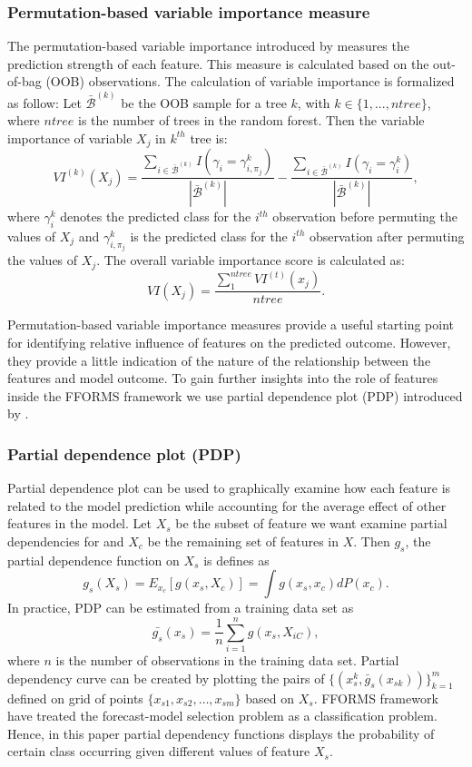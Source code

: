 \documentclass[11pt,a4paper,]{article}
\begin{document}
\subsubsection{Permutation-based variable importance
measure}\label{permutation-based-variable-importance-measure}

The permutation-based variable importance introduced by
\textcite{breiman2001random} measures the prediction strength of each
feature. This measure is calculated based on the out-of-bag (OOB)
observations. The calculation of variable importance is formalized as
follow: Let \(\bar{\mathcal{B}}^{(k)}\) be the OOB sample for a tree
\(k\), with \(k\in \{1,...,ntree\}\), where \(ntree\) is the number of
trees in the random forest. Then the variable importance of variable
\(X_{j}\) in \(k^{th}\) tree is:
\[VI^{(k)}(X_{j})=\frac{\sum_{i\in \bar{\mathcal{B}}^{(k)}}I(\gamma_{i}=\gamma_{i,\pi_{j}}^{k})}{|\bar{\mathcal{B}}^{(k)}|}-\frac{\sum_{i\in \bar{\mathcal{B}}^{(k)}}I(\gamma_{i}=\gamma_{i}^{k})}{|\bar{\mathcal{B}}^{(k)}|},\]
where \(\gamma_{i}^{k}\) denotes the predicted class for the \(i^{th}\)
observation before permuting the values of \(X_{j}\) and
\(\gamma_{i, \pi_{j}}^{k}\) is the predicted class for the \(i^{th}\)
observation after permuting the values of \(X_{j}\). The overall
variable importance score is calculated as:
\[VI(X_{j})=\frac{\sum_{1}^{ntree}VI^{(t)}(x_{j})}{ntree}.\]

Permutation-based variable importance measures provide a useful starting
point for identifying relative influence of features on the predicted
outcome. However, they provide a little indication of the nature of the
relationship between the features and model outcome. To gain further
insights into the role of features inside the FFORMS framework we use
partial dependence plot (PDP) introduced by
\textcite{friedman2008predictive}.

\subsubsection{Partial dependence plot
(PDP)}\label{partial-dependence-plot-pdp}

Partial dependence plot can be used to graphically examine how each
feature is related to the model prediction while accounting for the
average effect of other features in the model. Let \(X_s\) be the subset
of feature we want examine partial dependencies for and \(X_c\) be the
remaining set of features in \(X\). Then \(g_s\), the partial dependence
function on \(X_s\) is defines as
\[g_s(X_s)=E_{x_c}[g(x_s, X_c)]=\int{g(x_s, x_c)dP(x_c).}\] In practice,
PDP can be estimated from a training data set as
\[\bar{g_s}(x_s)=\frac{1}{n}\sum_{i=1}^{n}g(x_s, X_{iC}),\] where \(n\)
is the number of observations in the training data set. Partial
dependency curve can be created by plotting the pairs of
\(\{(x_s^k, \bar{g}_s(x_{sk}))\}_{k=1}^{m}\) defined on grid of points
\(\{x_{s1}, x_{s2},\dots, x_{sm}\}\) based on \(X_s\). FFORMS framework
have treated the forecast-model selection problem as a classification
problem. Hence, in this paper partial dependency functions displays the
probability of certain class occurring given different values of feature
\(X_s\).
\end{document}
